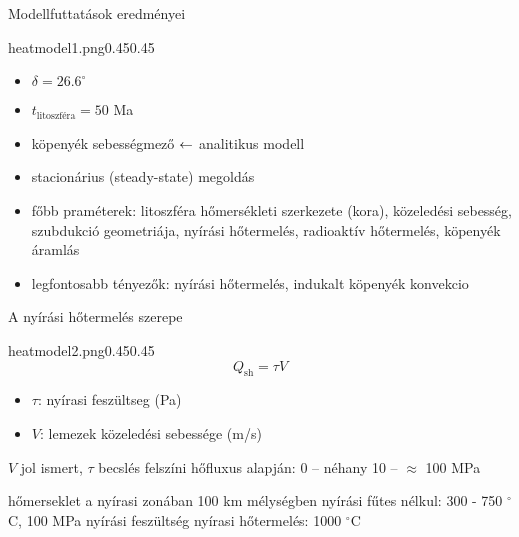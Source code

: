 \documentclass{beamer}
\begin{document}
\begin{frame}{Modellfuttatások eredményei}
    \begin{figp}{heatmodel1.png}{}{0.45}{0.45}
        \begin{itemize}
            \item $\delta = 26.6^\circ$
            \item $t_{\text{litoszféra}} = 50$ Ma
            \item köpenyék sebességmező $\leftarrow$ analitikus modell
            \item stacionárius (steady-state) megoldás
            \item főbb praméterek: litoszféra hőmersékleti szerkezete (kora), közeledési sebesség, szubdukció geometriája, nyírási hőtermelés, radioaktív hőtermelés, köpenyék áramlás
            \item legfontosabb tényezők: nyírási hőtermelés, indukalt köpenyék konvekcio
        \end{itemize}
    \end{figp}
\end{frame}


\begin{frame}{A nyírási hőtermelés szerepe}
    \begin{figp}{heatmodel2.png}{}{0.45}{0.45}
        \[
            Q_{\text{sh}} = \tau V
        \]
        \begin{itemize}
            \item $\tau$: nyírasi feszültseg (Pa)
            \item $V$: lemezek közeledési sebessége (m/s)
        \end{itemize}
        \vspace{10pt}
        
        $V$ jol ismert, $\tau$ becslés felszíni hőfluxus alapján: 0 -- néhany 10 -- $\approx$ 100 MPa
        \vspace{10pt}
        
        hőmerseklet a nyírasi zonában 100 km mélységben nyírási fűtes nélkul: 300 - 750 $^\circ$C, 100 MPa nyírási feszültség nyírasi hőtermelés: 1000 $^\circ$C
    \end{figp}
\end{frame}
\end{document}
